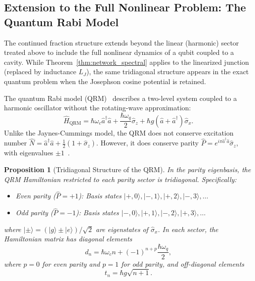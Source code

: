 \documentclass[reprint, floatfix, superscriptaddress, amsmath, amssymb, longbibliography]{revtex4-2}
\newtheorem{proposition}[theorem]{Proposition}
\begin{document}
\subsection{Extension to the Full Nonlinear Problem: The Quantum Rabi Model}
\label{sec:qrm_parity}

The continued fraction structure extends beyond the linear (harmonic) sector treated above to include the full nonlinear dynamics of a qubit coupled to a cavity. While Theorem~\ref{thm:network_spectral} applies to the linearized junction (replaced by inductance $L_J$), the same tridiagonal structure appears in the exact quantum problem when the Josephson cosine potential is retained.

The quantum Rabi model (QRM)~\cite{Rabi1936, Rabi1937} describes a two-level system coupled to a harmonic oscillator without the rotating-wave approximation:
\begin{equation}
\hat{H}_{\mathrm{QRM}} = \hbar\omega_c \hat{a}^\dagger \hat{a} + \frac{\hbar\omega_q}{2} \hat{\sigma}_z + \hbar g(\hat{a} + \hat{a}^\dagger)\hat{\sigma}_x.
\label{eq:qrm_hamiltonian}
\end{equation}
Unlike the Jaynes-Cummings model, the QRM does not conserve excitation number $\hat{N} = \hat{a}^\dagger\hat{a} + \frac{1}{2}(1 + \hat{\sigma}_z)$. However, it does conserve parity $\hat{P} = e^{i\pi \hat{a}^\dagger \hat{a}} \hat{\sigma}_z$, with eigenvalues $\pm 1$~\cite{Casanova2010}.

\begin{proposition}[Tridiagonal Structure of the QRM]
\label{prop:qrm_tridiagonal}
In the parity eigenbasis, the QRM Hamiltonian restricted to each parity sector is tridiagonal. Specifically:
\begin{itemize}
    \item \textit{Even parity} ($\hat{P} = +1$): Basis states $|+,0\rangle, |-,1\rangle, |+,2\rangle, |-,3\rangle, \ldots$
    \item \textit{Odd parity} ($\hat{P} = -1$): Basis states $|-,0\rangle, |+,1\rangle, |-,2\rangle, |+,3\rangle, \ldots$
\end{itemize}
where $|\pm\rangle = (|g\rangle \pm |e\rangle)/\sqrt{2}$ are eigenstates of $\hat{\sigma}_x$. In each sector, the Hamiltonian matrix has diagonal elements
\begin{equation}
d_n = \hbar\omega_c n + (-1)^{n+p} \frac{\hbar\omega_q}{2},
\label{eq:qrm_diagonal}
\end{equation}
where $p = 0$ for even parity and $p = 1$ for odd parity, and off-diagonal elements
\begin{equation}
t_n = \hbar g\sqrt{n+1}.
\label{eq:qrm_offdiagonal}
\end{equation}
\end{proposition}
\end{document}
